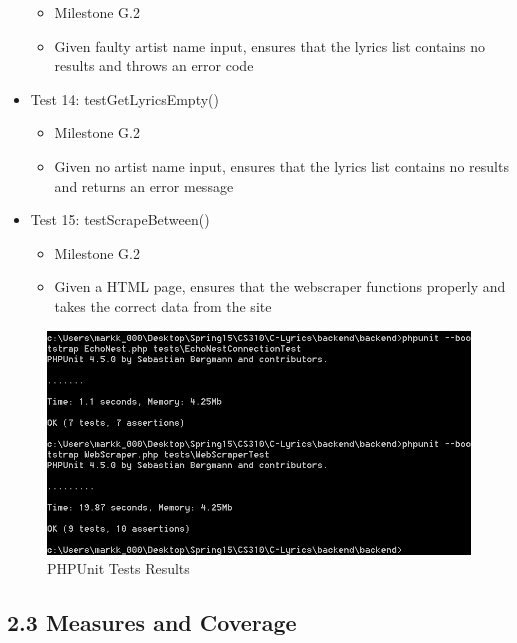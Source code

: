 \documentclass[]{article}
\begin{document}
\begin{itemize}
  \begin{itemize}
  \itemsep1pt\parskip0pt
  \item
    Milestone G.2
  \item
    Given faulty artist name input, ensures that the lyrics list
    contains no results and throws an error code
  \end{itemize}
\item
  Test 14: testGetLyricsEmpty()

  \begin{itemize}
  \itemsep1pt\parskip0pt
  \item
    Milestone G.2
  \item
    Given no artist name input, ensures that the lyrics list contains no
    results and returns an error message
  \end{itemize}
\item
  Test 15: testScrapeBetween()

  \begin{itemize}
  \itemsep1pt\parskip0pt
  \item
    Milestone G.2
  \item
    Given a HTML page, ensures that the webscraper functions properly
    and takes the correct data from the site
  \end{itemize}
\end{itemize}

\begin{figure}[htbp]
\centering
\includegraphics{phpunit.png}
\caption{PHPUnit Tests Results}
\end{figure}

\subsection{2.3 Measures and
Coverage}\label{measures-and-coverage}
\end{document}
